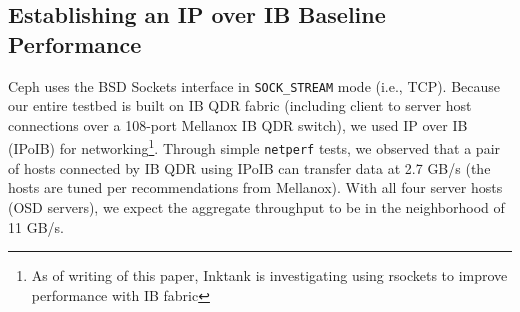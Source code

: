 \subsection{Establishing an IP over IB Baseline Performance}

Ceph uses the BSD Sockets interface in \texttt{SOCK\_STREAM} mode (i.e., TCP).
Because our entire testbed is built on IB QDR fabric (including client to
server host connections over a 108-port Mellanox IB QDR switch), we used IP
over IB (IPoIB) for networking\footnote{As of writing of this paper, Inktank
is investigating using rsockets to improve performance with IB fabric}. Through
simple \verb!netperf! tests, we observed that a pair of hosts connected by IB
QDR using IPoIB can transfer data at 2.7 GB/s (the hosts are tuned per
recommendations from Mellanox). With all four server hosts (OSD servers), we
expect the aggregate throughput to be in the neighborhood of 11 GB/s.


